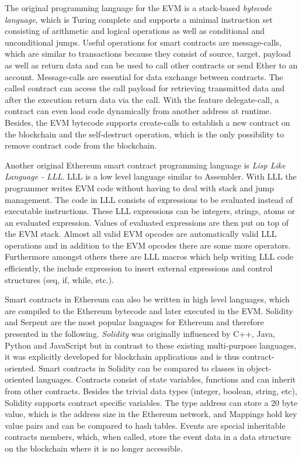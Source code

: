 \documentclass[conference]{IEEEtran}
\begin{document}
The original programming language for the EVM is a stack-based \textit{bytecode language}, which is Turing complete and supports a minimal instruction set consisting of arithmetic and logical operations as well as conditional and unconditional jumps. Useful operations for smart contracts are message-calls, which are similar to transactions because they consist of source, target, payload as well as return data and can be used to call other contracts or send Ether to an account. Message-calls are essential for data exchange between contracts. The called contract can access the call payload for retrieving transmitted data and after the execution return data via the call. With the feature delegate-call, a contract can even load code dynamically from another address at runtime. Besides, the EVM bytecode supports create-calls to establish a new contract on the blockchain and the self-destruct operation, which is the only possibility to remove contract code from the blockchain. \cite{Bartoletti2017} \cite{McAdams2017} \cite{Solidity2017}\par 
Another original Ethereum smart contract programming language is \textit{Lisp Like Language - LLL}. LLL is a low level language similar to Assembler. With LLL the programmer writes EVM code without having to deal with stack and jump management. The code in LLL consists of expressions to be evaluated instead of executable instructions. These LLL expressions can be integers, strings, atoms or an evaluated expression. Values of evaluated expressions are then put on top of the EVM stack. Almost all valid EVM opcodes are automatically valid LLL operations and in addition to the EVM opcodes there are some more operators. Furthermore amongst others there are LLL macros which help writing LLL code efficiently, the include expression to insert external expressions and control structures (seq, if, while, etc.). \cite{Edgington2017} \par 
Smart contracts in Ethereum can also be written in high level languages, which are compiled to the Ethereum bytecode and later executed in the EVM. Solidity and Serpent are the most popular languages for Ethereum and therefore presented in the following. \textit{Solidity} was originally influenced by C++, Java, Python and JavaScript but in contrast to these existing multi-purpose languages, it was explicitly developed for blockchain applications and is thus contract-oriented. Smart contracts in Solidity can be compared to classes in object-oriented languages. Contracts consist of state variables, functions and can inherit from other contracts. Besides the trivial data types (integer, boolean, string, etc), Solidity supports contract specific variables. The type address can store a 20 byte value, which is the address size in the Ethereum network, and Mappings hold key value pairs and can be compared to hash tables. Events are special inheritable contracts members, which, when called, store the event data in a data structure on the blockchain where it is no longer accessible. \cite{McAdams2017} \cite{Solidity2017}\par 
\end{document}
